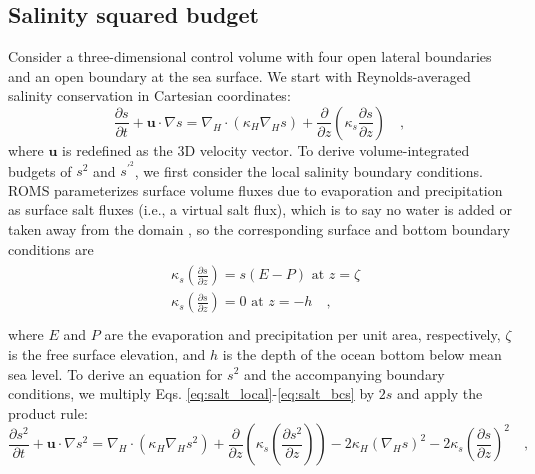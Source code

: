 \subsection{Salinity squared budget}

Consider a three-dimensional control volume with four open lateral boundaries and an open boundary at the sea surface. We start with Reynolds-averaged salinity conservation in Cartesian coordinates:
\begin{equation} \label{eq:salt_local}
    \frac{\partial s}{\partial t}+ \textbf{u} \cdot \nabla s =\nabla_H \cdot (\kappa_H \nabla_H s)+  \frac{\partial}{\partial z} \left(\kappa_s {\frac{\partial s}{\partial z}} \right) \quad ,
\end{equation}
where $\mathbf{u}$ is redefined as the 3D velocity vector. To derive volume-integrated budgets of $s^2$ and $s^{\prime^2}$, we first consider the local salinity boundary conditions. ROMS parameterizes surface volume fluxes due to evaporation and precipitation as surface salt fluxes (i.e., a virtual salt flux), which is to say no water is added or taken away from the domain \citep{nagy2020regional, roullet2000salt, shchepetkin2005regional}, so the corresponding surface and bottom boundary conditions are
\begin{align} \label{eq:salt_bcs}
    \begin{split}
        & \kappa_s \left({\frac{\partial s}{\partial z}} \right) = s(E-P) \,\, \textrm{at} \,\, z = \zeta \\
        & \kappa_s \left({\frac{\partial s}{\partial z}} \right) = 0 \,\, \textrm{at} \,\, z = -h \quad , \\
    \end{split}
\end{align} 
where $E$ and $P$ are the evaporation and precipitation per unit area, respectively, $\zeta$ is the free surface elevation, and $h$ is the depth of the ocean bottom below mean sea level. To derive an equation for $s^2$ and the accompanying boundary conditions, we multiply Eqs. \ref{eq:salt_local}-\ref{eq:salt_bcs} by $2s$ and apply the product rule:
\begin{equation} \label{eq:s2_local}
    \frac{\partial s^2}{\partial t} + \textbf{u} \cdot \nabla s^2   = \nabla_H \cdot \left(\kappa_H \nabla_H s^2 \right) + \frac{\partial }{\partial z}\left(\kappa_s \left(\frac{\partial s^2}{\partial z} \right) \right) - 2\kappa_H \left(\nabla_H s \right)^2 -2\kappa_s \left(\frac{\partial s}{\partial z} \right)^2 \quad ,
\end{equation}
